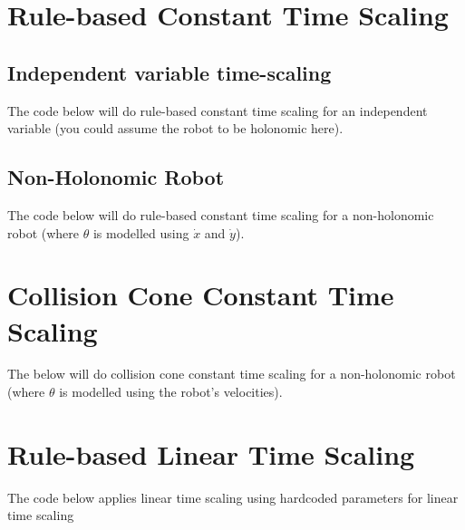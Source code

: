 
\section{Rule-based Constant Time Scaling}

\subsection{Independent variable time-scaling}
\label{app:holo-rb-cts-code}

The code below will do rule-based constant time scaling for an independent variable (you could assume the robot to be holonomic here).



\subsection{Non-Holonomic Robot}
\label{app:nh-rb-cts-code}

The code below will do rule-based constant time scaling for a non-holonomic robot (where $\theta$ is modelled using $\dot{x}$ and $\dot{y}$).



\section{Collision Cone Constant Time Scaling}
\label{app:nh-cc-cts-code}

The below will do collision cone constant time scaling for a non-holonomic robot (where $\theta$ is modelled using the robot's velocities).



\section{Rule-based Linear Time Scaling}
\label{app:nh-rb-lts-code}

The code below applies linear time scaling using hardcoded parameters for linear time scaling


